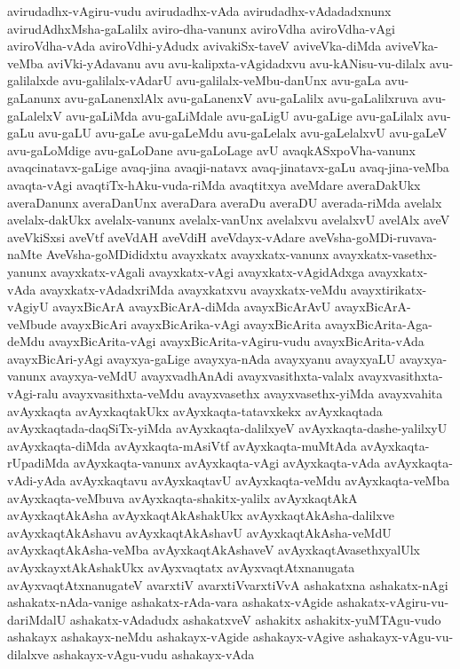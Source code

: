 {avirudadhx-vAgiru-vudu
avirudadhx-vAda
avirudadhx-vAdadadxnunx
avirudAdhxMsha-gaLalilx
aviro-dha-vanunx
aviroVdha
aviroVdha-vAgi
aviroVdha-vAda
aviroVdhi-yAdudx
avivakiSx-taveV
aviveVka-diMda
aviveVka-veMba
aviVki-yAdavanu
avu
avu-kalipxta-vAgidadxvu
avu-kANisu-vu-dilalx
avu-galilalxde
avu-galilalx-vAdarU
avu-galilalx-veMbu-danUnx
avu-gaLa
avu-gaLanunx
avu-gaLanenxlAlx
avu-gaLanenxV
avu-gaLalilx
avu-gaLalilxruva
avu-gaLalelxV
avu-gaLiMda
avu-gaLiMdale
avu-gaLigU
avu-gaLige
avu-gaLilalx
avu-gaLu
avu-gaLU
avu-gaLe
avu-gaLeMdu
avu-gaLelalx
avu-gaLelalxvU
avu-gaLeV
avu-gaLoMdige
avu-gaLoDane
avu-gaLoLage
avU
avaqkASxpoVha-vanunx
avaqcinatavx-gaLige
avaq-jina
avaqji-natavx
avaq-jinatavx-gaLu
avaq-jina-veMba
avaqta-vAgi
avaqtiTx-hAku-vuda-riMda
avaqtitxya
aveMdare
averaDakUkx
averaDanunx
averaDanUnx
averaDara
averaDu
averaDU
averada-riMda
avelalx
avelalx-dakUkx
avelalx-vanunx
avelalx-vanUnx
avelalxvu
avelalxvU
avelAlx
aveV
aveVkiSxsi
aveVtf
aveVdAH
aveVdiH
aveVdayx-vAdare
aveVsha-goMDi-ruvava-naMte
AveVsha-goMDididxtu
avayxkatx
avayxkatx-vanunx
avayxkatx-vasethx-yanunx
avayxkatx-vAgali
avayxkatx-vAgi
avayxkatx-vAgidAdxga
avayxkatx-vAda
avayxkatx-vAdadxriMda
avayxkatxvu
avayxkatx-veMdu
avayxtirikatx-vAgiyU
avayxBicArA
avayxBicArA-diMda
avayxBicArAvU
avayxBicArA-veMbude
avayxBicAri
avayxBicArika-vAgi
avayxBicArita
avayxBicArita-Aga-deMdu
avayxBicArita-vAgi
avayxBicArita-vAgiru-vudu
avayxBicArita-vAda
avayxBicAri-yAgi
avayxya-gaLige
avayxya-nAda
avayxyanu
avayxyaLU
avayxya-vanunx
avayxya-veMdU
avayxvadhAnAdi
avayxvasithxta-valalx
avayxvasithxta-vAgi-ralu
avayxvasithxta-veMdu
avayxvasethx
avayxvasethx-yiMda
avayxvahita
avAyxkaqta
avAyxkaqtakUkx
avAyxkaqta-tatavxkekx
avAyxkaqtada
avAyxkaqtada-daqSiTx-yiMda
avAyxkaqta-dalilxyeV
avAyxkaqta-dashe-yalilxyU
avAyxkaqta-diMda
avAyxkaqta-mAsiVtf
avAyxkaqta-muMtAda
avAyxkaqta-rUpadiMda
avAyxkaqta-vanunx
avAyxkaqta-vAgi
avAyxkaqta-vAda
avAyxkaqta-vAdi-yAda
avAyxkaqtavu
avAyxkaqtavU
avAyxkaqta-veMdu
avAyxkaqta-veMba
avAyxkaqta-veMbuva
avAyxkaqta-shakitx-yalilx
avAyxkaqtAkA
avAyxkaqtAkAsha
avAyxkaqtAkAshakUkx
avAyxkaqtAkAsha-dalilxve
avAyxkaqtAkAshavu
avAyxkaqtAkAshavU
avAyxkaqtAkAsha-veMdU
avAyxkaqtAkAsha-veMba
avAyxkaqtAkAshaveV
avAyxkaqtAvasethxyalUlx
avAyxkayxtAkAshakUkx
avAyxvaqtatx
avAyxvaqtAtxnanugata
avAyxvaqtAtxnanugateV
avarxtiV
avarxtiVvarxtiVvA
ashakatxna
ashakatx-nAgi
ashakatx-nAda-vanige
ashakatx-rAda-vara
ashakatx-vAgide
ashakatx-vAgiru-vu-dariMdalU
ashakatx-vAdadudx
ashakatxveV
ashakitx
ashakitx-yuMTAgu-vudo
ashakayx
ashakayx-neMdu
ashakayx-vAgide
ashakayx-vAgive
ashakayx-vAgu-vu-dilalxve
ashakayx-vAgu-vudu
ashakayx-vAda
}
